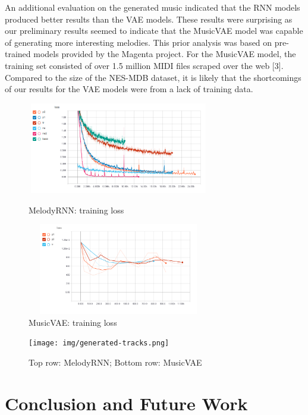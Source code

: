 \documentclass{article}
\begin{document}
An additional evaluation on the generated music indicated that the RNN models produced better results than the VAE models. These results were surprising as our preliminary results seemed to indicate that the MusicVAE model was capable of generating more interesting melodies. This prior analysis was based on pre-trained models provided by the Magenta project. For the MusicVAE model, the training set consisted of over 1.5 million MIDI files scraped over the web [3]. Compared to the size of the NES-MDB dataset, it is likely that the shortcomings of our results for the VAE models were from a lack of training data.

\begin{figure}[htb!]
  \begin{minipage}{0.48\textwidth}
    \centering
    \includegraphics[height=4cm, width=8cm]{img/rnn_loss_all.png}
    \caption{MelodyRNN: training loss}
  \end{minipage}\hfill
  \begin{minipage}{0.48\textwidth}
    \centering
    \includegraphics[height=4cm, width=8cm]{img/vae_loss.png}
    \caption{MusicVAE: training loss}
  \end{minipage}
\end{figure}

\begin{figure}[htb!]
  \begin{minipage}{1.0\textwidth}
    \centering
    \texttt{[image: img/generated-tracks.png]}
    \caption{Top row: MelodyRNN; Bottom row: MusicVAE}
  \end{minipage}
\end{figure}


\section{Conclusion and Future Work}
\end{document}
